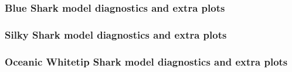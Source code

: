 \documentclass[12pt,draft]{article}
\begin{document}
 \subsubsection*{Blue Shark model diagnostics and extra plots}

%   
%   
%   
%   
 
 
%  
%  
%  
 
 \subsubsection*{Silky Shark model diagnostics and extra plots}
 
%  

\subsubsection*{Oceanic Whitetip Shark model diagnostics and extra plots}
\end{document}

